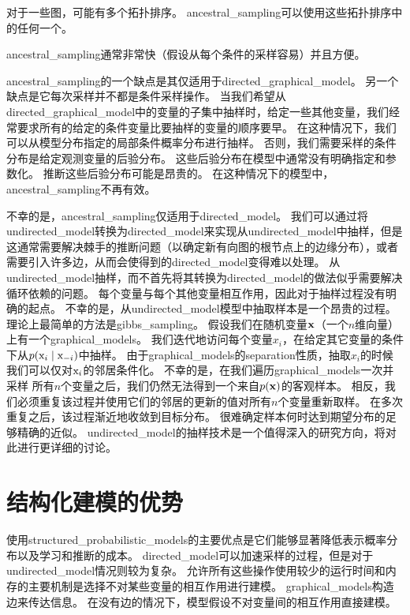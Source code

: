 对于一些图，可能有多个拓扑排序。 
\gls{ancestral_sampling}可以使用这些拓扑排序中的任何一个。

\gls{ancestral_sampling}通常非常快（假设从每个条件的采样容易）并且方便。


\gls{ancestral_sampling}的一个缺点是其仅适用于\gls{directed_graphical_model}。 
另一个缺点是它每次采样并不都是条件采样操作。
当我们希望从\gls{directed_graphical_model}中的变量的子集中抽样时，给定一些其他变量，我们经常要求所有的给定的条件变量比要抽样的变量的顺序要早。
在这种情况下，我们可以从模型分布指定的局部条件概率分布进行抽样。 
否则，我们需要采样的条件分布是给定观测变量的后验分布。
这些后验分布在模型中通常没有明确指定和参数化。 
推断这些后验分布可能是昂贵的。 
在这种情况下的模型中，\gls{ancestral_sampling}不再有效。



不幸的是，\gls{ancestral_sampling}仅适用于\gls{directed_model}。 
我们可以通过将\gls{undirected_model}转换为\gls{directed_model}来实现从\gls{undirected_model}中抽样，但是这通常需要解决棘手的推断问题（以确定新有向图的根节点上的边缘分布），或者需要引入许多边，从而会使得到的\gls{directed_model}变得难以处理。
从\gls{undirected_model}抽样，而不首先将其转换为\gls{directed_model}的做法似乎需要解决循环依赖的问题。 
每个变量与每个其他变量相互作用，因此对于抽样过程没有明确的起点。
不幸的是，从\gls{undirected_model}模型中抽取样本是一个昂贵的过程。
理论上最简单的方法是\gls{gibbs_sampling}。
假设我们在随机变量$\mathbf{x}$（一个$n$维向量）上有一个\gls{graphical_models}。 
我们迭代地访问每个变量$x_i$，在给定其它变量的条件下从$p(\mathrm{x}_i \mid \mathrm{x}_{-i})$中抽样。
由于\gls{graphical_models}的\gls{separation}性质，抽取$x_i$的时候我们可以仅对$\mathrm{x}_i$的邻居条件化。
不幸的是，在我们遍历\gls{graphical_models}一次并采样 所有$n$个变量之后，我们仍然无法得到一个来自$p(\mathbf{x})$的客观样本。
相反，我们必须重复该过程并使用它们的邻居的更新的值对所有$n$个变量重新取样。
在多次重复之后，该过程渐近地收敛到目标分布。
很难确定样本何时达到期望分布的足够精确的近似。
\gls{undirected_model}的抽样技术是一个值得深入的研究方向，将对此进行更详细的讨论。




\section{结构化建模的优势}
\label{sec:advantages_of_structured_modelling}


使用\gls{structured_probabilistic_models}的主要优点是它们能够显著降低表示概率分布以及学习和推断的成本。
\gls{directed_model}可以加速采样的过程，但是对于\gls{undirected_model}情况则较为复杂。
允许所有这些操作使用较少的运行时间和内存的主要机制是选择不对某些变量的相互作用进行建模。
\gls{graphical_models}构造边来传达信息。
在没有边的情况下，模型假设不对变量间的相互作用直接建模。


